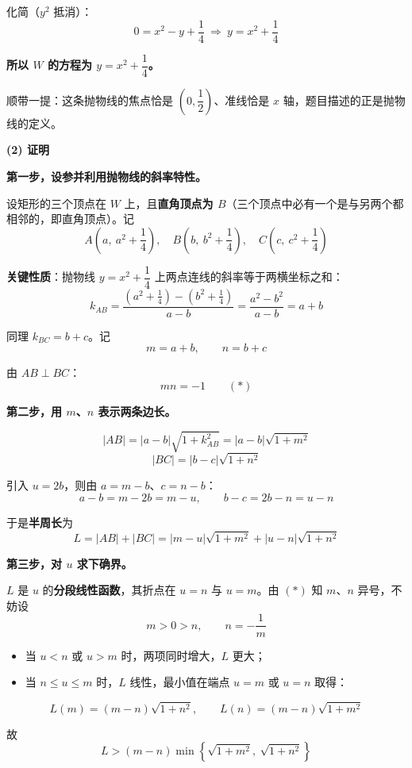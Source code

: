 化简（$y^{2}$ 抵消）：
\[0=x^{2}-y+\frac14\ \Longrightarrow\ y=x^{2}+\frac14\]

\textbf{所以 $W$ 的方程为 $y=x^{2}+\dfrac14$。}

\begin{gktip}
顺带一提：这条抛物线的焦点恰是 $\left(0,\dfrac12\right)$、准线恰是 $x$ 轴，题目描述的正是抛物线的定义。
\end{gktip}

\par\medskip

\textbf{(2) 证明}

\textbf{第一步，设参并利用抛物线的斜率特性。}

设矩形的三个顶点在 $W$ 上，且\textbf{直角顶点为 $B$}（三个顶点中必有一个是与另两个都相邻的，即直角顶点）。记
\[A\left(a,\ a^{2}+\frac14\right),\quad B\left(b,\ b^{2}+\frac14\right),\quad C\left(c,\ c^{2}+\frac14\right)\]

\textbf{关键性质}：抛物线 $y=x^{2}+\dfrac14$ 上两点连线的斜率等于两横坐标之和：
\[k_{AB}=\frac{\left(a^{2}+\frac14\right)-\left(b^{2}+\frac14\right)}{a-b}=\frac{a^{2}-b^{2}}{a-b}=a+b\]

同理 $k_{BC}=b+c$。记
\[m=a+b,\qquad n=b+c\]

由 $AB\perp BC$：
\[mn=-1\qquad(\ast)\]

\textbf{第二步，用 $m$、$n$ 表示两条边长。}

\[|AB|=|a-b|\sqrt{1+k_{AB}^{2}}=|a-b|\sqrt{1+m^{2}}\]
\[|BC|=|b-c|\sqrt{1+n^{2}}\]

引入 $u=2b$，则由 $a=m-b$、$c=n-b$：
\[a-b=m-2b=m-u,\qquad b-c=2b-n=u-n\]

于是\textbf{半周长}为
\[L=|AB|+|BC|=|m-u|\sqrt{1+m^{2}}+|u-n|\sqrt{1+n^{2}}\]

\textbf{第三步，对 $u$ 求下确界。}

$L$ 是 $u$ 的\textbf{分段线性函数}，其折点在 $u=n$ 与 $u=m$。由 $(\ast)$ 知 $m$、$n$ 异号，不妨设
\[m>0>n,\qquad n=-\frac1m\]

\begin{itemize}
\item 当 $u<n$ 或 $u>m$ 时，两项同时增大，$L$ 更大；
\item 当 $n\le u\le m$ 时，$L$ 线性，最小值在端点 $u=m$ 或 $u=n$ 取得：
\end{itemize}

\[L(m)=(m-n)\sqrt{1+n^{2}},\qquad L(n)=(m-n)\sqrt{1+m^{2}}\]

故
\[L>\left(m-n\right)\min\left\{\sqrt{1+m^{2}},\ \sqrt{1+n^{2}}\right\}\]

